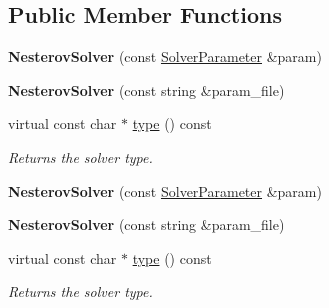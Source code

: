 \subsection*{Public Member Functions}
\begin{DoxyCompactItemize}
\item 
\mbox{\label{classcaffe_1_1_nesterov_solver_aa4c7f611c593d0b62dafa3167e3e9004}} 
{\bfseries Nesterov\+Solver} (const \mbox{\hyperlink{classcaffe_1_1_solver_parameter}{Solver\+Parameter}} \&param)
\item 
\mbox{\label{classcaffe_1_1_nesterov_solver_afed2e1d70d4952228e63c996f1aa22a8}} 
{\bfseries Nesterov\+Solver} (const string \&param\+\_\+file)
\item 
\mbox{\label{classcaffe_1_1_nesterov_solver_a034bfdd0f75b9f29ec0b61393aea8387}} 
virtual const char $\ast$ \mbox{\hyperlink{classcaffe_1_1_nesterov_solver_a034bfdd0f75b9f29ec0b61393aea8387}{type}} () const
\begin{DoxyCompactList}\small\item\em Returns the solver type. \end{DoxyCompactList}\item 
\mbox{\label{classcaffe_1_1_nesterov_solver_aa4c7f611c593d0b62dafa3167e3e9004}} 
{\bfseries Nesterov\+Solver} (const \mbox{\hyperlink{classcaffe_1_1_solver_parameter}{Solver\+Parameter}} \&param)
\item 
\mbox{\label{classcaffe_1_1_nesterov_solver_afed2e1d70d4952228e63c996f1aa22a8}} 
{\bfseries Nesterov\+Solver} (const string \&param\+\_\+file)
\item 
\mbox{\label{classcaffe_1_1_nesterov_solver_a034bfdd0f75b9f29ec0b61393aea8387}} 
virtual const char $\ast$ \mbox{\hyperlink{classcaffe_1_1_nesterov_solver_a034bfdd0f75b9f29ec0b61393aea8387}{type}} () const
\begin{DoxyCompactList}\small\item\em Returns the solver type. \end{DoxyCompactList}\end{DoxyCompactItemize}

